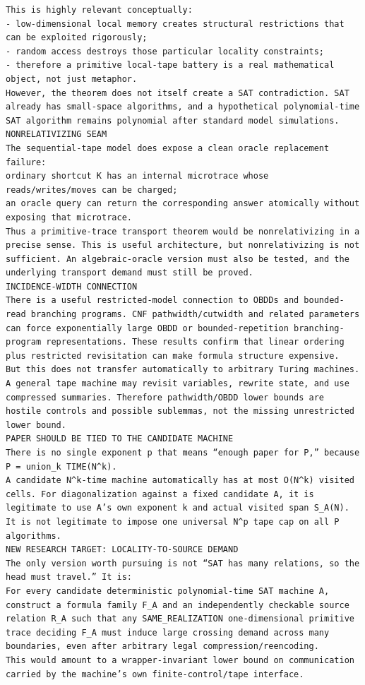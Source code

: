 \documentclass[11pt]{article}
\begin{document}
\begin{Verbatim}[breaklines=true,breakanywhere=true]
This is highly relevant conceptually:
- low-dimensional local memory creates structural restrictions that can be exploited rigorously;
- random access destroys those particular locality constraints;
- therefore a primitive local-tape battery is a real mathematical object, not just metaphor.
However, the theorem does not itself create a SAT contradiction. SAT already has small-space algorithms, and a hypothetical polynomial-time SAT algorithm remains polynomial after standard model simulations.
NONRELATIVIZING SEAM
The sequential-tape model does expose a clean oracle replacement failure:
ordinary shortcut K has an internal microtrace whose reads/writes/moves can be charged;
an oracle query can return the corresponding answer atomically without exposing that microtrace.
Thus a primitive-trace transport theorem would be nonrelativizing in a precise sense. This is useful architecture, but nonrelativizing is not sufficient. An algebraic-oracle version must also be tested, and the underlying transport demand must still be proved.
INCIDENCE-WIDTH CONNECTION
There is a useful restricted-model connection to OBDDs and bounded-read branching programs. CNF pathwidth/cutwidth and related parameters can force exponentially large OBDD or bounded-repetition branching-program representations. These results confirm that linear ordering plus restricted revisitation can make formula structure expensive.
But this does not transfer automatically to arbitrary Turing machines. A general tape machine may revisit variables, rewrite state, and use compressed summaries. Therefore pathwidth/OBDD lower bounds are hostile controls and possible sublemmas, not the missing unrestricted lower bound.
PAPER SHOULD BE TIED TO THE CANDIDATE MACHINE
There is no single exponent p that means “enough paper for P,” because
P = union_k TIME(N^k).
A candidate N^k-time machine automatically has at most O(N^k) visited cells. For diagonalization against a fixed candidate A, it is legitimate to use A’s own exponent k and actual visited span S_A(N). It is not legitimate to impose one universal N^p tape cap on all P algorithms.
NEW RESEARCH TARGET: LOCALITY-TO-SOURCE DEMAND
The only version worth pursuing is not “SAT has many relations, so the head must travel.” It is:
For every candidate deterministic polynomial-time SAT machine A, construct a formula family F_A and an independently checkable source relation R_A such that any SAME_REALIZATION one-dimensional primitive trace deciding F_A must induce large crossing demand across many boundaries, even after arbitrary legal compression/reencoding.
This would amount to a wrapper-invariant lower bound on communication carried by the machine’s own finite-control/tape interface.

\end{Verbatim}
\end{document}
